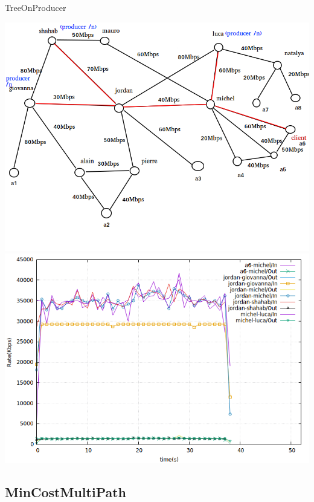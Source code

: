 \documentclass[8pt]{beamer}
\newcommand{\1}{\mathbbm 1}
\begin{document}
\begin{frame}{TreeOnProducer}
{\includegraphics[scale=0.22]{figures/TreeOnProducer_big.png} 
\includegraphics[scale=0.21]{figures/treeonproducer_big.png} 

}



\end{frame}


\subsection{MinCostMultiPath}
\end{document}
